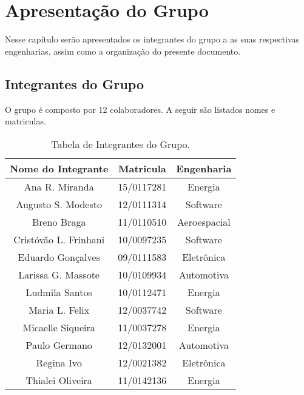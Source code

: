\chapter[Apresentação do Grupo]{Apresentação do Grupo}
\label{chap:apresentacao}
	
	Nesse capítulo serão apresentados os integrantes do grupo a as suas respectivas engenharias, assim como a organização do presente documento.

	\section[Integrantes do Grupo]{Integrantes do Grupo}
	\label{sec:apresentacao_integrantes}

		O grupo é composto por 12 colaboradores. A seguir são listados nomes e matriculas.

		\label{subsubsec:informacoesGerais_integrantes_tables}
		\begin{table}[h]
			\centering 
			\begin{tabular}{|c|c|c|}
			\hline
			\rowcolor[HTML]{C0C0C0} 

				{\color[HTML]{000000} \textbf{Nome do Integrante}} & {\color[HTML]{000000} \textbf{Matricula}} & {\color[HTML]{000000} \textbf{Engenharia}} \\ \hline

				Ana R. Miranda & 15/0117281 & Energia \\ \hline
				Augusto S. Modesto & 12/0111314 & Software  \\ \hline
				Breno Braga & 11/0110510 & Aeroespacial \\ \hline
				Cristóvão L. Frinhani & 10/0097235 & Software \\ \hline
				Eduardo Gonçalves & 09/0111583 & Eletrônica \\ \hline
				Larissa G. Massote & 10/0109934 & Automotiva \\ \hline
				Ludmila Santos & 10/0112471 & Energia \\ \hline
				Maria L. Felix & 12/0037742 & Software \\ \hline
				Micaelle Siqueira & 11/0037278 & Energia \\ \hline
				Paulo Germano & 12/0132001 & Automotiva \\ \hline
				Regina Ivo & 12/0021382 & Eletrônica \\ \hline
				Thialei Oliveira & 11/0142136 & Energia \\ \hline

			\end{tabular}
			\caption[Tabela de Integrantes do Grupo]{Tabela de Integrantes do Grupo.}
			\label{tab:informacoesGerais_integrantes_.tables}
		\end{table}


